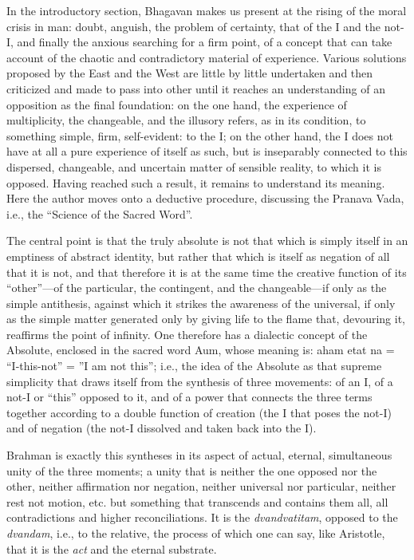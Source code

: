In the introductory section, Bhagavan makes us present at the rising of the moral crisis in man: doubt, anguish, the problem of certainty, that of the I and the not-I, and finally the anxious searching for a firm point, of a concept that can take account of the chaotic and contradictory material of experience. Various solutions proposed by the East and the West are little by little undertaken and then criticized and made to pass into other until it reaches an understanding of an opposition as the final foundation: on the one hand, the experience of multiplicity, the changeable, and the illusory refers, as in its condition, to something simple, firm, self-evident: to the I; on the other hand, the I does not have at all a pure experience of itself as such, but is inseparably connected to this dispersed, changeable, and uncertain matter of sensible reality, to which it is opposed. Having reached such a result, it remains to understand its meaning. Here the author moves onto a deductive procedure, discussing the Pranava Vada, i.e., the ``Science of the Sacred Word''.

The central point is that the truly absolute is not that which is simply itself in an emptiness of abstract identity, but rather that which is itself as negation of all that it is not, and that therefore it is at the same time the creative function of its ``other''---of the particular, the contingent, and the changeable---if only as the simple antithesis, against which it strikes the awareness of the universal, if only as the simple matter generated only by giving life to the flame that, devouring it, reaffirms the point of infinity. One therefore has a dialectic concept of the Absolute, enclosed in the sacred word Aum, whose meaning is: aham etat na = ``I-this-not'' = ''I am not this''; i.e., the idea of the Absolute as that supreme simplicity that draws itself from the synthesis of three movements: of an I, of a not-I or ``this'' opposed to it, and of a power that connects the three terms together according to a double function of creation (the I that poses the not-I) and of negation (the not-I dissolved and taken back into the I).

Brahman is exactly this syntheses in its aspect of actual, eternal, simultaneous unity of the three moments; a unity that is neither the one opposed nor the other, neither affirmation nor negation, neither universal nor particular, neither rest not motion, etc. but something that transcends and contains them all, all contradictions and higher reconciliations. It is the \emph{dvandvatitam}, opposed to the \emph{dvandam}, i.e., to the relative, the process of which one can say, like Aristotle, that it is the \emph{act} and the eternal substrate.

